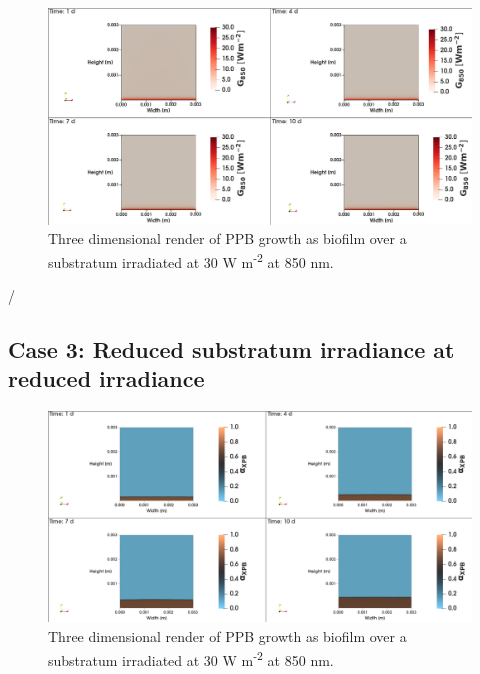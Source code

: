 \begin{figure}[H]
    \centering
    \includegraphics[width=\textwidth,height=0.4\textheight]{Chap4/results/post_processing/2D_cases/case2_rad.png}
    \caption{Three dimensional render of PPB growth as biofilm over a substratum irradiated at 30 W m\textsuperscript{-2} at 850 nm. } 
    \label{fig:case5_3D_rad}
\end{figure}

/
\subsection{Case 3: Reduced substratum irradiance at reduced irradiance}
\begin{figure}[H]
    \centering
    \includegraphics[width=\textwidth,height=0.4\textheight]{Chap4/results/post_processing/2D_cases/case3_ppb.png}
    \caption{Three dimensional render of PPB growth as biofilm over a substratum irradiated at 30 W m\textsuperscript{-2} at 850 nm. } 
    \label{fig:case5_3D_rad}
\end{figure}

